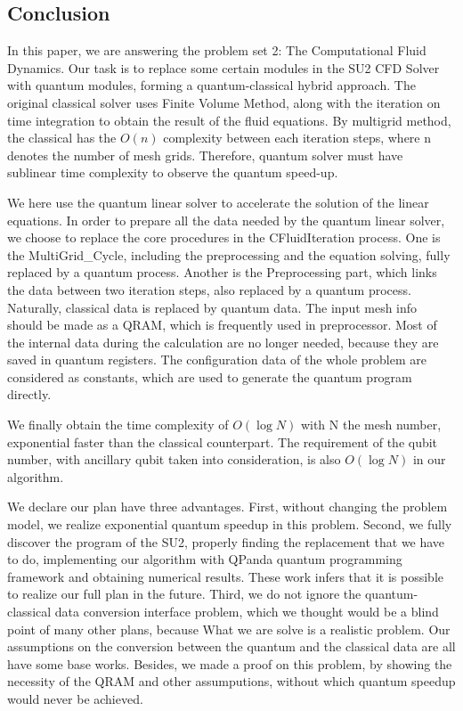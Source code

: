 \documentclass[%
 reprint,
 amsmath,amssymb,
pra,
]{revtex4-1}
\begin{document}
\begin{itemize}
\section{Conclusion}

In this paper, we are answering the problem set 2: The Computational Fluid Dynamics. Our task is to replace some certain modules in the SU2 CFD Solver with quantum modules, forming a quantum-classical hybrid approach. The original classical solver uses Finite Volume Method, along with the iteration on time integration to obtain the result of the fluid equations. By multigrid method, the classical has the $O(n)$ complexity between each iteration steps, where n denotes the number of mesh grids. Therefore, quantum solver must have sublinear time complexity to observe the quantum speed-up.

We here use the quantum linear solver to accelerate the solution of the linear equations. In order to prepare all the data needed by the quantum linear solver, we choose to replace the core procedures in the CFluidIteration process. One is the MultiGrid\_Cycle, including the preprocessing and the equation solving, fully replaced by a quantum process. Another is the Preprocessing part, which links the data between two iteration steps, also replaced by a quantum process. Naturally, classical data is replaced by quantum data. The input mesh info should be made as a QRAM, which is frequently used in preprocessor. Most of the internal data during the calculation are no longer needed, because they are saved in quantum registers. The configuration data of the whole problem are considered as constants, which are used to generate the quantum program directly.

We finally obtain the time complexity of $O(\log N)$ with N the mesh number, exponential faster than the classical counterpart. The requirement of the qubit number, with ancillary qubit taken into consideration, is also $O(\log N)$ in our algorithm.

We declare our plan have three advantages. First, without changing the problem model, we realize exponential quantum speedup in this problem. Second, we fully discover the program of the SU2, properly finding the replacement that we have to do, implementing our algorithm with QPanda quantum programming framework and obtaining numerical results. These work infers that it is possible to realize our full plan in the future. Third, we do not ignore the quantum-classical data conversion interface problem, which we thought would be a blind point of many other plans, because What we are solve is a realistic problem. Our assumptions on the conversion between the quantum and the classical data are all have some base works. Besides, we made a proof on this problem, by showing the necessity of the QRAM and other assumputions, without which quantum speedup would never be achieved.


\end{itemize}
\end{document}
